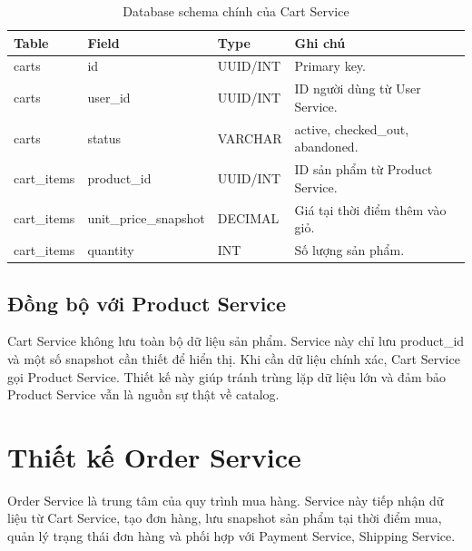 \documentclass[../main.tex]{subfiles}
\begin{document}
\begin{table}[H]
    \centering
    \caption{Database schema chính của Cart Service}
    \label{tab:chapter2-cart-db}
    \begin{tabular}{|p{}|p{}|p{}|p{}|}
        \hline
        \rowcolor{primary!35}
        \textbf{Table} & \textbf{Field} & \textbf{Type} & \textbf{Ghi chú} \\
        \hline
        carts & id & UUID/INT & Primary key. \\
        \hline
        carts & user\_id & UUID/INT & ID người dùng từ User Service. \\
        \hline
        carts & status & VARCHAR & active, checked\_out, abandoned. \\
        \hline
        cart\_items & product\_id & UUID/INT & ID sản phẩm từ Product Service. \\
        \hline
        cart\_items & unit\_price\_snapshot & DECIMAL & Giá tại thời điểm thêm vào giỏ. \\
        \hline
        cart\_items & quantity & INT & Số lượng sản phẩm. \\
        \hline
    \end{tabular}
\end{table}

\subsection{Đồng bộ với Product Service}
\label{subsection:2.5.5}

Cart Service không lưu toàn bộ dữ liệu sản phẩm. Service này chỉ lưu product\_id và một số snapshot cần thiết để hiển thị. Khi cần dữ liệu chính xác, Cart Service gọi Product Service. Thiết kế này giúp tránh trùng lặp dữ liệu lớn và đảm bảo Product Service vẫn là nguồn sự thật về catalog.

\section{Thiết kế Order Service}
\label{section:2.6}

Order Service là trung tâm của quy trình mua hàng. Service này tiếp nhận dữ liệu từ Cart Service, tạo đơn hàng, lưu snapshot sản phẩm tại thời điểm mua, quản lý trạng thái đơn hàng và phối hợp với Payment Service, Shipping Service.
\end{document}
